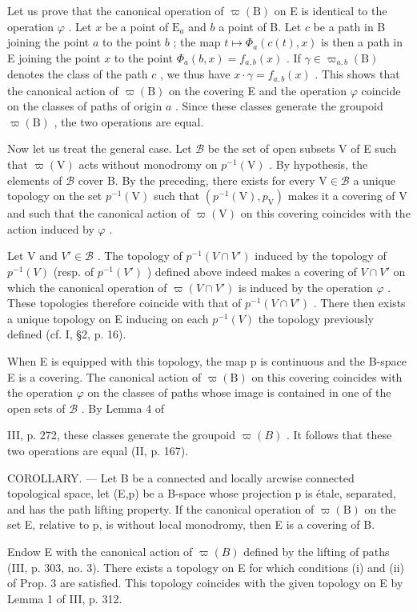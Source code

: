 Let us prove that the canonical operation of \(\varpi(\mathrm{B})\) on E is identical to the operation \(\varphi\) . Let \(x\) be a point of \(\mathrm{E}_a\) and \(b\) a point of B. Let \(c\) be a path in B joining the point \(a\) to the point \(b\) ; the map \(t \mapsto \Phi_a(c(t), x)\) is then a path in E joining the point \(x\) to the point \(\Phi_a(b, x) = f_{a,b}(x)\) . If \(\gamma \in \varpi_{a,b}(\mathrm{B})\) denotes the class of the path \(c\) , we thus have \(x \cdot \gamma = f_{a,b}(x)\) . This shows that the canonical action of \(\varpi(\mathrm{B})\) on the covering E and the operation \(\varphi\) coincide on the classes of paths of origin \(a\) . Since these classes generate the groupoid \(\varpi(\mathrm{B})\) , the two operations are equal.

Now let us treat the general case. Let \(\mathcal{B}\) be the set of open subsets V of E such that \(\varpi(\mathrm{V})\) acts without monodromy on \(p^{-1}(\mathrm{V})\) . By hypothesis, the elements of \(\mathcal{B}\) cover B. By the preceding, there exists for every \(\mathrm{V} \in \mathcal{B}\) a unique topology on the set \(p^{-1}(\mathrm{V})\) such that \((p^{-1}(\mathrm{V}), p_{\mathrm{V}})\) makes it a covering of V and such that the canonical action of \(\varpi(\mathrm{V})\) on this covering coincides with the action induced by \(\varphi\) .

Let V and \(V' \in \mathcal{B}\) . The topology of \(p^{-1}(V \cap V')\) induced by the topology of \(p^{-1}(V)\) (resp. of \(p^{-1}(V')\) ) defined above indeed makes a covering of \(V \cap V'\) on which the canonical operation of \(\varpi(V \cap V')\) is induced by the operation \(\varphi\) . These topologies therefore coincide with that of \(p^{-1}(V \cap V')\) . There then exists a unique topology on E inducing on each \(p^{-1}(V)\) the topology previously defined (cf. I, §2, p. 16).

When E is equipped with this topology, the map p is continuous and the B-space E is a covering. The canonical action of \(\varpi(\mathrm{B})\) on this covering coincides with the operation \(\varphi\) on the classes of paths whose image is contained in one of the open sets of \(\mathcal{B}\) . By Lemma 4 of

III, p. 272, these classes generate the groupoid \(\varpi(B)\) . It follows that these two operations are equal (II, p. 167).

COROLLARY. --- Let B be a connected and locally arcwise connected topological space, let (E,p) be a B-space whose projection p is étale, separated, and has the path lifting property. If the canonical operation of \(\varpi(\mathrm{B})\) on the set E, relative to p, is without local monodromy, then E is a covering of B.

Endow E with the canonical action of \(\varpi(B)\) defined by the lifting of paths (III, p. 303, no. 3). There exists a topology on E for which conditions (i) and (ii) of Prop. 3 are satisfied. This topology coincides with the given topology on E by Lemma 1 of III, p. 312.

